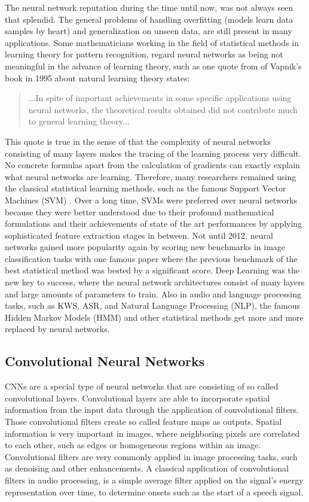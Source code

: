 The neural network reputation during the time until now, was not always seen that splendid.
The general problems of handling overfitting (models learn data samples by heart) and generalization on unseen data, are still present in many applications.
Some mathematicians working in the field of statistical methods in learning theory for pattern recognition, regard neural networks as being not meaningful in the advance of learning theory, such as one quote from \cite{Vapnik1995} of Vapnik's book in 1995 about natural learning theory states:
\begin{quote}
...In spite of important achievements in some specific applications using neural networks, the theoretical results obtained did not contribute much to general learning theory...
\end{quote}
This quote is true in the sense of that the complexity of neural networks consisting of many layers makes the tracing of the learning process very difficult.
No concrete formulas apart from the calculation of gradients can exactly explain what neural networks are learning.
Therefore, many researchers remained using the classical statistical learning methods, such as the famous Support Vector Machines (SVM) \cite{Cortes1995}.
Over a long time, SVMs were preferred over neural networks because they were better understood due to their profound mathematical formulations and their achievements of state of the art performances by applying sophisticated feature extraction stages in between.
Not until 2012, neural networks gained more popularity again by scoring new benchmarks in image classification tasks with one famous paper \cite{Krizhevsky2012} where the previous benchmark of the best statistical method was bested by a significant score.
Deep Learning was the new key to success, where the neural network architectures consist of many layers and large amounts of parameters to train.
Also in audio and language processing tasks, such as KWS, ASR, and Natural Language Processing (NLP), the famous Hidden Markov Models (HMM) and other statistical methods get more and more replaced by neural networks.



\subsection{Convolutional Neural Networks}\label{sec:prev_nn_cnn}
CNNs are a special type of neural networks that are consisting of so called convolutional layers.
Convolutional layers are able to incorporate spatial information from the input data through the application of convolutional filters.
Those convolutional filters create so called feature maps as outputs.
Spatial information is very important in images, where neighboring pixels are correlated to each other, such as edges or homogeneous regions within an image.
Convolutional filters are very commonly applied in image processing tasks, such as denoising and other enhancements.
A classical application of convolutional filters in audio processing, is a simple average filter applied on the signal's energy representation over time, to determine onsets such as the start of a speech signal.


